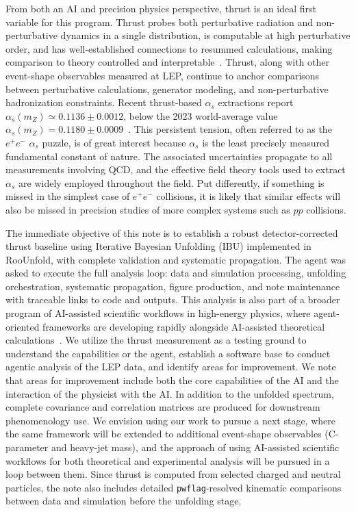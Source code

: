 From both an AI and precision physics perspective, thrust is an ideal first variable for this program.
Thrust probes both perturbative radiation and non-perturbative dynamics in a
single distribution, is computable at high perturbative order, and has well-established
connections to resummed calculations, making comparison to theory controlled and
interpretable~\cite{PhysRevLett.39.1587,Abbate:2010xh,Heister:2003aj}. Thrust, along with other event-shape observables measured at LEP, continue to anchor comparisons between
perturbative calculations, generator modeling, and non-perturbative hadronization
constraints. Recent thrust-based $\alpha_s$ extractions report
$\alpha_s(m_Z)\simeq 0.1136\pm 0.0012$, below the 2023 world-average value
$\alpha_s(m_Z)=0.1180\pm 0.0009$~\cite{Benitez:2024nav,ParticleDataGroup:2022pth}.
This persistent tension, often referred to as the $e^{+}e^{-}$ $\alpha_{s}$ puzzle, is of great interest because $\alpha_{s}$ is the least precisely measured fundamental constant of nature. The associated uncertainties propagate to all measurements involving QCD, and the effective field theory tools used to extract $\alpha_{s}$ are widely employed throughout the field. Put differently, if something is missed in the simplest case of $e^{+}e^{-}$ collisions, it is likely that similar effects will also be missed in precision studies of more complex systems such as $pp$ collisions. 


The immediate objective of this note is to establish a robust detector-corrected
thrust baseline using Iterative Bayesian Unfolding (IBU) implemented in RooUnfold,
with complete validation and systematic propagation. The agent was asked to execute
the full analysis loop: data and simulation processing, unfolding orchestration,
systematic propagation, figure production, and note maintenance with traceable links
to code and outputs. This analysis is also part of a broader program of
AI-assisted scientific workflows in high-energy physics, where agent-oriented
frameworks are developing rapidly alongside AI-assisted theoretical
calculations~\cite{Abolhasani:2023sdl,MacLeod:2020sdl,Chen:2024scienceagentbench,Lu:2024aiscientist,Woodruff:2026practicalsi,Bubeck:2025coscientist,OpenAITheory:2026singleminus,Schwartz:2026cparameterllm}. We utilize the thrust measurement as a testing ground to understand the capabilities or the agent, establish a software base to conduct agentic analysis of the LEP data, and identify areas for improvement. We note that areas for improvement include both the core capabilities of the AI and the interaction of the physicist with the AI.
In addition to the unfolded spectrum, complete covariance and correlation matrices
are produced for downstream phenomenology use. We envision using our work to pursue a next stage, where the same framework
will be extended to additional event-shape observables (C-parameter and heavy-jet
mass), and the approach of using AI-assisted scientific workflows for both theoretical
and experimental analysis will be pursued in a loop between them. Since thrust is
computed from selected charged and neutral particles, the note also includes detailed
\texttt{pwflag}-resolved kinematic comparisons between data and simulation before the
unfolding stage.

